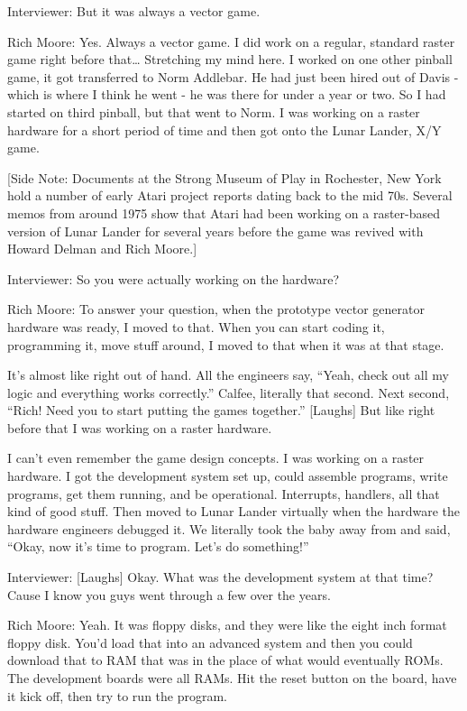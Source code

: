 \textcolor{interviewer}{Interviewer:} But it was always a vector game.

\textcolor{interviewee}{Rich Moore:} Yes. Always a vector game. I did work on a regular, standard raster game right before that… Stretching my mind here. I worked on one other pinball game, it got transferred to Norm Addlebar. He had just been hired out of Davis - which is where I think he went - he was there for under a year or two. So I had started on third pinball, but that went to Norm. I was working on a raster hardware for a short period of time and then got onto the Lunar Lander, X/Y game.

[Side Note: Documents at the Strong Museum of Play in Rochester, New York hold a number of early Atari project reports dating back to the mid 70s. Several memos from around 1975 show that Atari had been working on a raster-based version of Lunar Lander for several years before the game was revived with Howard Delman and Rich Moore.]

\textcolor{interviewer}{Interviewer:} So you were actually working on the hardware?

\textcolor{interviewee}{Rich Moore:} To answer your question, when the prototype vector generator hardware was ready, I moved to that. When you can start coding it, programming it, move stuff around, I moved to that when it was at that stage.

It's almost like right out of hand. All the engineers say, “Yeah, check out all my logic and everything works correctly.” Calfee, literally that second. Next second, “Rich! Need you to start putting the games together.” [Laughs] But like right before that I was working on a raster hardware. 

I can't even remember the game design concepts. I was working on a raster hardware. I got the development system set up, could assemble programs, write programs, get them running, and be operational. Interrupts, handlers, all that kind of good stuff. Then moved to Lunar Lander virtually when the hardware the hardware engineers debugged it. We literally took the baby away from and said, “Okay, now it's time to program. Let's do something!”

\textcolor{interviewer}{Interviewer:} [Laughs] Okay. What was the development system at that time? Cause I know you guys went through a few over the years.

\textcolor{interviewee}{Rich Moore:} Yeah. It was floppy disks, and they were like the eight inch format floppy disk. You'd load that into an advanced system and then you could download that to RAM that was in the place of what would eventually ROMs. The development boards were all RAMs. Hit the reset button on the board, have it kick off, then try to run the program.

